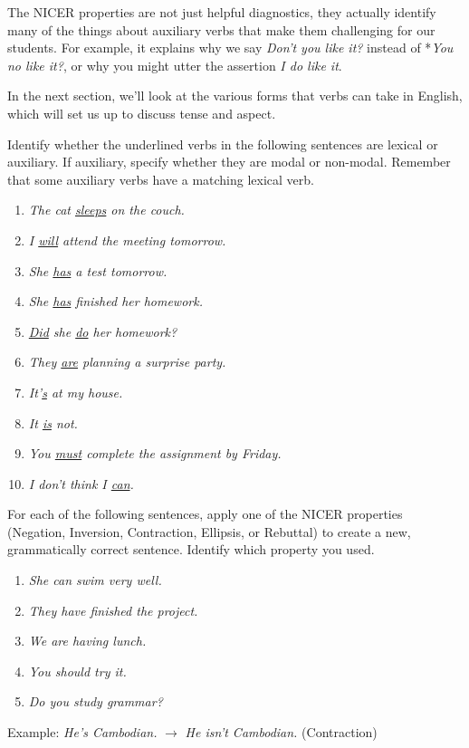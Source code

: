 The NICER properties are not just helpful diagnostics, they actually identify many of the things about auxiliary verbs that make them challenging for our students. For example, it explains why we say \textit{Don't you like it?} instead of *\textit{You no like it?}, or why you might utter the assertion \textit{I do like it}.

In the next section, we'll look at the various forms that verbs can take in English, which will set us up to discuss tense and aspect.

\begin{tcolorbox}[title=Exercise: Basic Verb Types, colback=white, colframe=blue!75!black, fonttitle=\bfseries]
Identify whether the underlined verbs in the following sentences are lexical or auxiliary. If auxiliary, specify whether they are modal or non-modal. Remember that some auxiliary verbs have a matching lexical verb.

\begin{enumerate}[nosep]
    \item \textit{The cat \uline{sleeps} on the couch.}
    \item \textit{I \uline{will} attend the meeting tomorrow.}
    \item \textit{She \uline{has} a test tomorrow.}
    \item \textit{She \uline{has} finished her homework.}
    \item \textit{\uline{Did} she \uline{do} her homework?}
    \item \textit{They \uline{are} planning a surprise party.}
    \item \textit{It'\uline{s} at my house.}
    \item \textit{It \uline{is} not.}
    \item \textit{You \uline{must} complete the assignment by Friday.}
    \item \textit{I don't think I \uline{can}.}
\end{enumerate}
For each of the following sentences, apply one of the NICER properties (Negation, Inversion, Contraction, Ellipsis, or Rebuttal) to create a new, grammatically correct sentence. Identify which property you used.

\begin{enumerate}[nosep]
    \item \textit{She can swim very well.}
    \item \textit{They have finished the project.}
    \item \textit{We are having lunch.}
    \item \textit{You should try it.}
    \item \textit{Do you study grammar?}
\end{enumerate}

Example: \textit{He's Cambodian.} $\rightarrow$ \textit{He isn't Cambodian.} (Contraction)
\end{tcolorbox}

